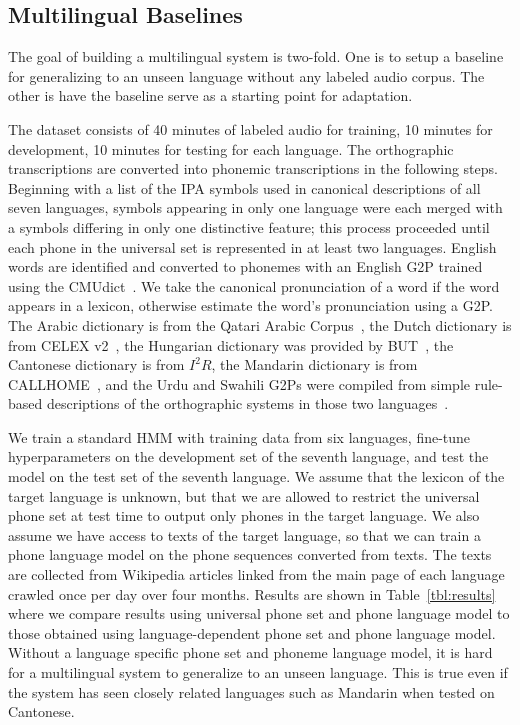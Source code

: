 \subsection{Multilingual Baselines}
\label{sec:mlbaseline}

The goal of building a multilingual system is two-fold.
One is to setup a baseline for generalizing to an unseen
language without any labeled audio corpus.  The other
is have the baseline serve as a starting point for
adaptation.

The dataset consists of 40 minutes of labeled audio for training,
10 minutes for development, 10 minutes for testing
for each language.
The orthographic transcriptions are converted into
phonemic transcriptions in the following steps.
Beginning with a list of the IPA symbols used in canonical descriptions
of all seven languages,
symbols appearing in only one language were each merged with a symbols
differing in only one distinctive feature; this process proceeded until 
each phone in the universal set is represented in at least two languages.
English words are identified and converted to phonemes with
an English G2P trained using the CMUdict~\cite{Lenco15}.
We take the canonical pronunciation of a word if the word
appears in a lexicon,
otherwise estimate the word's pronunciation using a G2P.
The Arabic dictionary is from the Qatari Arabic Corpus~\cite{Elmahdy14},
the Dutch dictionary is from CELEX v2~\cite{Baayen96},
the Hungarian dictionary was provided by BUT~\cite{Grezl14},
the Cantonese dictionary is from $I^2R$,
the Mandarin dictionary is from CALLHOME~\cite{Canavan96},
and the Urdu and Swahili G2Ps were compiled from simple
rule-based descriptions of the orthographic systems in those
two languages~\cite{Hasegawajohnson15}.

We train a standard HMM with training data from six languages,
fine-tune hyperparameters on the development set of the seventh language,
and test the model on the test set of the seventh language.
We assume that the lexicon of the target language is unknown,
but that we are allowed to restrict the universal phone set 
at test time
to output only phones in the target language.
We also assume we have access to texts of the target language,
so that we can train a phone language model on the phone
sequences converted from texts.
The texts are collected from Wikipedia articles linked
from the main page of each language crawled once per day over four months.
Results are shown in Table~\ref{tbl:results} where we compare results using
universal phone set and phone language model to those obtained using 
language-dependent phone set and phone language model.
Without a language specific phone set and phoneme language model,
it is hard for a multilingual system to generalize to
an unseen language.  This is true even if the system has seen
closely related languages such as Mandarin
when tested on Cantonese.

